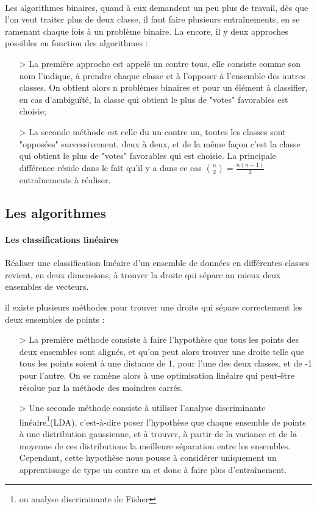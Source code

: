 \documentclass[a4paper,10pt]{report}
\begin{document}
\begin{multicols}{2}
\paragraph{}
Les algorithmes binaires, quand à eux demandent un peu plus de travail, dès que l'on veut traiter plus de deux classe, il faut faire plusieurs entraînements, en se ramenant chaque fois à un problème binaire. La encore, il y deux approches possibles en fonction des algorithmes :
 \begin{itemize}
   \item[>] La première approche est appelé un contre tous, elle consiste comme son nom l'indique, à prendre chaque classe et à l'opposer à l'ensemble des autres classes. On obtient alors n problèmes binaires et pour un élément à classifier, en cas d'ambiguïté, la classe qui obtient le plus de "votes" favorables est choisie;
   \item[>] La seconde méthode est celle du un contre un, toutes les classes sont "opposées" successivement, deux à deux, et de la même façon c'est la classe qui obtient le plus de "votes" favorables qui est choisie. La principale différence réside dans le fait qu'il y a dans ce cas ${n \choose 2}=\frac{n(n-1)}{2}$ entraînements à réaliser.
 \end{itemize}
 \subsection{Les algorithmes}
\paragraph{Les classifications linéaires\\}
Réaliser une classification linéaire d'un ensemble de données en différentes classes revient, en deux dimensions, à trouver la droite qui sépare au mieux deux ensembles de vecteurs.

il existe plusieurs méthodes pour trouver une droite qui sépare correctement les deux ensembles de points :
\begin{itemize}
  \item[>] La première méthode consiste à faire l'hypothèse que tous les points des deux ensembles sont alignés, et qu'on peut alors trouver une droite telle que tous les points soient à une distance de 1, pour l'une des deux classes, et de -1 pour l'autre. On se ramène alors à une optimisation linéaire qui peut-être résolue par la méthode des moindres carrés.
  \item[>] Une seconde méthode consiste à utiliser l'analyse discriminante linéaire\footnote{ou analyse discriminante de Fisher}(LDA), c'est-à-dire poser l'hypothèse que chaque ensemble de points à une distribution gaussienne, et à trouver, à partir de la variance et de la moyenne de ces distributions la meilleure séparation entre les ensembles. Cependant, cette hypothèse nous pousse à considérer uniquement un apprentissage de type un contre un et donc à faire plus d'entraînement.
\end{itemize}

\end{multicols}
\end{document}
